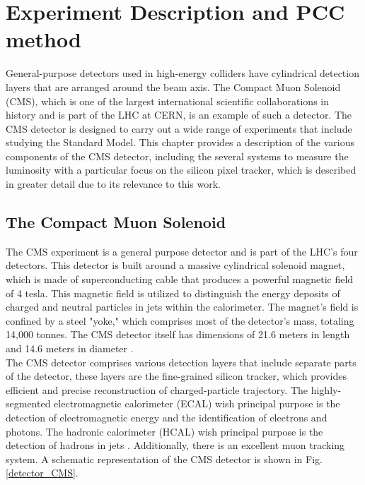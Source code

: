 \chapter{Experiment Description and PCC method}
 
 General-purpose detectors used in high-energy colliders have cylindrical detection layers that are arranged around the beam axis. The Compact Muon Solenoid (CMS), which is one of the largest international scientific collaborations in history and is part of the LHC at CERN, is an example of such a detector. The CMS detector is designed to carry out a wide range of experiments that include studying the Standard Model. This chapter provides a description of the various components of the CMS detector, including the several systems to measure the luminosity with a particular focus on the silicon pixel tracker, which is described in greater detail due to its relevance to this work.
 
\section{The Compact Muon Solenoid}

The CMS experiment is a general purpose detector and is part of the LHC's four detectors. This detector is built around a massive cylindrical solenoid magnet, which is made of superconducting cable that produces a powerful magnetic field of 4 tesla. This magnetic field is utilized to distinguish the energy deposits of charged and neutral particles in jets within the calorimeter. The magnet's field is confined by a steel "yoke," which comprises most of the detector's mass, totaling 14,000 tonnes. The CMS detector itself has dimensions of 21.6 meters in length and 14.6 meters in diameter \cite{CMS_Exp_2008}.\\

The CMS detector comprises various detection layers that include separate parts of the detector, these layers are the fine-grained silicon tracker, which provides efficient and precise reconstruction of charged-particle trajectory. The highly-segmented electromagnetic calorimeter (ECAL) wish principal purpose is the detection of  electromagnetic energy and the identification of electrons and photons. The hadronic calorimeter (HCAL) wish principal purpose is the detection of hadrons in jets  \cite{CMS_Exp_2008}. Additionally, there is an excellent muon tracking system. A schematic representation of the CMS detector is shown in Fig. \ref{detector_CMS}.

